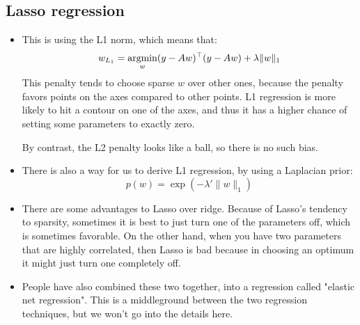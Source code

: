 \subsection{Lasso regression}
\begin{itemize}
	\item This is using the L1 norm, which means that:
		\[
			w_{L_1} = \operatorname*{argmin}_w (y - Aw)^{\top} (y - Aw) + \lambda \|w\|_1
		\]
		This penalty tends to choose sparse \( w \) over other ones, because the
		penalty favors points on the axes compared to other points. L1 regression is
		more likely to hit a contour on one of the axes, and thus it has a higher
		chance of setting some parameters to exactly zero. 

		By contrast, the L2 penalty looks like a ball, so there is no such bias. 
	\item There is also a way for us to derive L1 regression, by using a Laplacian
		prior:
		\[
			p(w) = \exp(-\lambda' \|w\|_1)
		\]
	\item There are some advantages to Lasso over ridge. Because of Lasso's tendency
		to sparsity, sometimes it is best to just turn one of the parameters off,
		which is sometimes favorable. On the other hand, when you have two parameters
		that are highly correlated, then Lasso is bad because in choosing an optimum
		it might just turn one completely off. 
	\item People have also combined these two together, into a regression called
		"elastic net regression". This is a middleground between the two regression
		techniques, but we won't go into the details here. 
\end{itemize}
